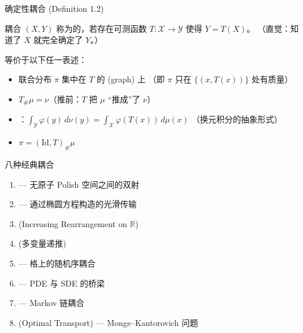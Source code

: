 \documentclass[aspectratio=169,10pt]{beamer}
\begin{document}
\begin{frame}{确定性耦合 (Definition 1.2)}
  \begin{TLtext}
    耦合 $(X,Y)$ 称为的，若存在可测函数
    $T\colon\mathcal{X}\to\mathcal{Y}$ 使得 $Y=T(X)$。
    \enspace（直觉：知道了 $X$ 就完全确定了 $Y$。）
  \end{TLtext}

  \vspace{0.3em}
  等价于以下任一表述：
  \begin{itemize}
    \item 联合分布 $\pi$ 集中在 $T$ 的 (graph) 上
      \;（即 $\pi$ 只在 $\{(x,T(x))\}$ 处有质量）
    \item $T_{\#}\mu = \nu$\enspace （推前：$T$ 把 $\mu$ ``推成''了 $\nu$）
    \item {}：$\displaystyle
      \int_{\mathcal{Y}}\varphi(y)\,d\nu(y)
      =\int_{\mathcal{X}}\varphi(T(x))\,d\mu(x)$\;
      （换元积分的抽象形式）
    \item $\pi = (\mathrm{Id}, T)_{\#}\mu$
  \end{itemize}

  \vspace{0.3em}
\end{frame}


\begin{frame}{八种经典耦合}
  \begin{TLtext}
    \begin{enumerate}
      \item {} — 无原子 Polish 空间之间的双射
      \item {} — 通过椭圆方程构造的光滑传输
      \item {} (Increasing Rearrangement on $\mathbb{R}$)
      \item {} (多变量递推)
      \item {} — 格上的随机序耦合
      \item {} — PDE 与 SDE 的桥梁
      \item {} — Markov 链耦合
      \item {} (Optimal Transport) — Monge–Kantorovich 问题
    \end{enumerate}
  \end{TLtext}
\end{frame}
\end{document}

